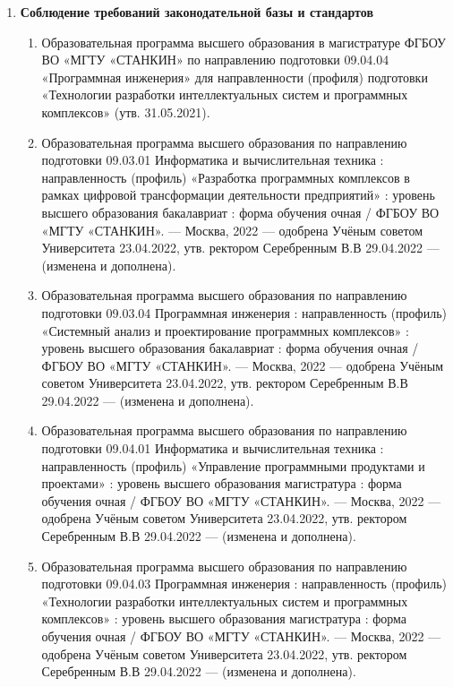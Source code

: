 \begin{enumerate} [nosep,font=\bfseries, left=0pt]
\begin{enumerate} [nosep, label*=\arabic*.,font=\bfseries]
			\item \textbf{Соблюдение требований законодательной базы и стандартов}

				\begin{enumerate} [nosep, label*=\arabic*.]

					\item Образовательная программа высшего образования в магистратуре ФГБОУ ВО «МГТУ «СТАНКИН» по направлению подготовки 09.04.04 «Программная инженерия» для направленности (профиля) подготовки «Технологии разработки интеллектуальных систем и программных комплексов» (утв. 31.05.2021).


					\item  Образовательная программа высшего образования по направлению подготовки 09.03.01 Информатика и вычислительная техника : направленность (профиль) «Разработка программных комплексов в рамках цифровой трансформации деятельности предприятий» : уровень высшего образования бакалавриат : форма обучения очная  / ФГБОУ ВО «МГТУ «СТАНКИН». --- Москва, 2022 --- одобрена Учёным советом Университета 23.04.2022, утв. ректором Серебренным В.В 29.04.2022  --- (изменена и дополнена).

					\item Образовательная программа высшего образования по направлению подготовки 09.03.04 Программная инженерия : направленность (профиль) «Системный анализ и проектирование программных комплексов» : уровень высшего образования бакалавриат : форма обучения очная / ФГБОУ ВО «МГТУ «СТАНКИН». --- Москва, 2022 --- одобрена Учёным советом Университета 23.04.2022, утв. ректором Серебренным В.В 29.04.2022  --- (изменена и дополнена).

					\item Образовательная программа высшего образования по направлению подготовки 09.04.01 Информатика и вычислительная техника : направленность (профиль) «Управление программными продуктами и проектами» : уровень высшего образования магистратура : форма обучения очная / ФГБОУ ВО «МГТУ «СТАНКИН». --- Москва, 2022 --- одобрена Учёным советом Университета 23.04.2022, утв. ректором Серебренным В.В 29.04.2022  --- (изменена и дополнена).

					\item Образовательная программа высшего образования по направлению подготовки 09.04.03  Программная инженерия : направленность (профиль) «Технологии разработки интеллектуальных систем и программных комплексов» : уровень высшего образования магистратура : форма обучения очная / ФГБОУ ВО «МГТУ «СТАНКИН». --- Москва, 2022 --- одобрена Учёным советом Университета 23.04.2022, утв. ректором Серебренным В.В 29.04.2022  --- (изменена и дополнена).


\end{enumerate}
\end{enumerate}
\end{enumerate}
